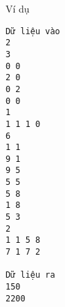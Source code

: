 Ví dụ
\begin{verbatim}
Dữ liệu vào
2
3
0 0
2 0
0 2
0 0
1
1 1 1 0
6
1 1
9 1
9 5
5 5
5 8
1 8
5 3
2
1 1 5 8
7 1 7 2	

Dữ liệu ra
150
2200
\end{verbatim}